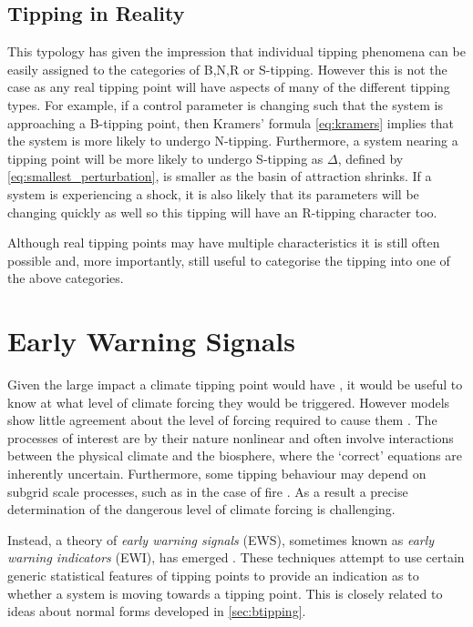 \subsection{Tipping in Reality}
This typology has given the impression that individual tipping phenomena can be easily assigned to the categories of B,N,R or S-tipping. However this is not the case as any
real tipping point will have aspects of many of the different tipping types. For example, if a control parameter is changing such that the system is approaching a B-tipping point,
then Kramers' formula \cref{eq:kramers} implies that the system is more likely to undergo N-tipping. Furthermore, a system nearing a tipping point will be more likely to undergo S-tipping as
$\Delta$, defined by \cref{eq:smallest_perturbation}, is smaller as the basin of attraction shrinks. If a system is experiencing a shock, it is also likely that its parameters will
be changing quickly as well so this tipping will have an R-tipping character too.

Although real tipping points may have multiple characteristics it is still often possible and, more importantly, still useful to categorise the tipping into one of the above categories.


\section{Early Warning Signals}
Given the large impact a climate tipping point would have \parencite{Lenton2019a}, it would be useful to know at what level of climate forcing they would be triggered.
However models show little agreement about the level of forcing required to cause them \parencite{Drijfhout2015}. The processes of interest are by their nature
nonlinear and often involve interactions between the physical climate and the biosphere, where the `correct' equations are inherently uncertain. Furthermore,
some tipping behaviour may depend on subgrid scale processes, such as in the case of fire \parencite{Mangeon2016}. As a result a precise determination of the dangerous level of climate
forcing is challenging.

Instead, a theory of \emph{early warning signals} (EWS), sometimes known as  \emph{early warning indicators} (EWI), has emerged \parencite{Dakos2008,Scheffer2009,Lenton2011,Williamson2015}.
These techniques attempt to use certain generic statistical features of tipping points to provide an indication as to whether a system is
moving towards a tipping point. This is closely related to ideas about normal forms developed in \cref{sec:btipping}.

